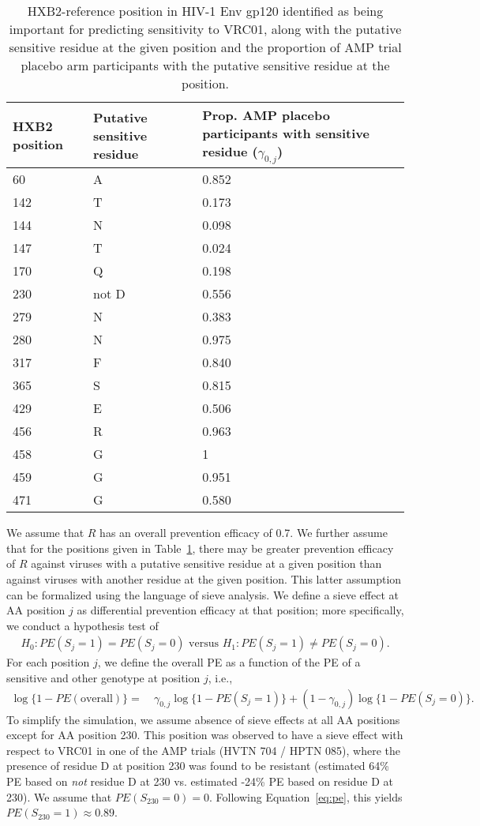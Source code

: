 \documentclass[10pt]{article}
\begin{document}
\begin{table}
  \caption{HXB2-reference position in HIV-1 Env gp120 identified as being important for predicting sensitivity to VRC01, along with the putative sensitive residue at the given position and the proportion of AMP trial placebo arm participants with the putative sensitive residue at the position.}
  \label{tab:sens}
  \begin{tabular}{lll}
    HXB2 position & Putative sensitive residue & Prop. AMP placebo participants with sensitive residue ($\gamma_{0,j}$)\\
    \hline
    60 & A & 0.852 \\
    142 & T & 0.173 \\
    144 & N & 0.098 \\
    147 & T & 0.024 \\
    170 & Q & 0.198 \\
    230 & not D & 0.556 \\
    279 & N & 0.383 \\
    280 & N & 0.975 \\
    317 & F & 0.840 \\
    365 & S & 0.815 \\
    429 & E & 0.506 \\
    456 & R & 0.963 \\
    458 & G & 1 \\
    459 & G & 0.951 \\
    471 & G & 0.580 \\
  \end{tabular}
\end{table}

We assume that $R$ has an overall prevention efficacy of 0.7. We further assume that for the positions given in Table~\ref{tab:sens}, there may be greater prevention efficacy of $R$ against viruses with a putative sensitive residue at a given position than against viruses with another residue at the given position. This latter assumption can be formalized using the language of sieve analysis. We define a sieve effect at AA position $j$ as differential prevention efficacy at that position; more specifically, we conduct a hypothesis test of
\begin{align*}
  H_0: PE(S_j = 1) = PE(S_j = 0) \text{ versus } H_1: PE(S_j = 1) \neq PE(S_j = 0).
\end{align*}
For each position $j$, we define the overall PE as a function of the PE of a sensitive and other genotype at position $j$, i.e.,
\begin{align}
  \log \{1 - PE(\text{overall})\} =& \ \gamma_{0,j} \log \{1 - PE(S_j = 1)\} + (1 - \gamma_{0,j}) \log \{1 - PE(S_j = 0)\}. \label{eq:pe}
\end{align}
To simplify the simulation, we assume absence of sieve effects at all AA positions except for AA position 230. This position was observed to have a sieve effect with respect to VRC01 in one of the AMP trials (HVTN 704 / HPTN 085), where the presence of residue D at position 230 was found to be resistant (estimated 64\% PE based on \emph{not} residue D at 230 vs. estimated -24\% PE based on residue D at 230). We assume that $PE(S_{230} = 0) = 0$. Following Equation~\eqref{eq:pe}, this yields $PE(S_{230} = 1) \approx 0.89$.
\end{document}
